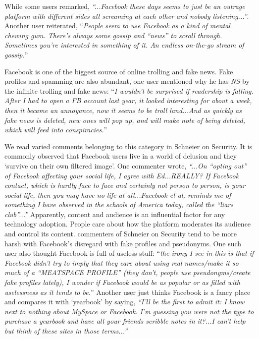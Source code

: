 While some users remarked, \textit{``...Facebook these days seems to just be an outrage platform with different sides all screaming at each other and nobody listening...''}. Another user reiterated, ``\textit{People seem to use Facebook as a kind of mental chewing gum. There's always some gossip and ``news'' to scroll through. Sometimes you're interested in something of it. An endless on-the-go stream of gossip.}''

Facebook is one of the biggest source of online trolling and fake news. Fake profiles and spamming are also abundant, one user mentioned why he has \emph{NS} by the infinite trolling and fake news: ``\textit{I wouldn't be surprised if readership is falling. After I had to open a FB account last year, it looked interesting for about a week, then it became an annoyance, now it seems to be troll land...And as quickly as fake news is deleted, new ones will pop up, and will make note of being deleted, which will feed into conspiracies.}''

We read varied comments belonging to this category in Schneier on Security. It is commonly observed that Facebook users live in a world of delusion and they `survive on their own filtered image'. One commenter wrote, \textit{``...On ``opting out'' of Facebook affecting your social life, I agree with Ed...REALLY? If Facebook contact, which is hardly face to face and certainly not person to person, is your social life, then you may have no life at all...Facebook et al, reminds me of something I have observed in the schools of America today, called the ``liars club''...''} Apparently, content and audience is an influential factor for any technology adoption. People care about how the platform moderates its audience and control its content. commenters of Schneier on Security tend to be more harsh with Facebook's disregard with fake profiles and pseudonyms. One such user also thought Facebook is full of useless stuff:
``\textit{the irony I see in this is that if Facebook didn't try to imply that they care about using real names/make it so much of a ``MEATSPACE PROFILE'' (they don't, people use pseudonyms/create fake profiles lately), I wonder if Facebook would be as popular or as filled with uselessness as it tends to be.}'' Another user just thinks Facebook is a fancy place and compares it with `yearbook' by saying, \textit{``I'll be the first to admit it: I know next to nothing about MySpace or Facebook. I'm guessing you were not the type to purchase a yearbook and have all your friends scribble notes in it?...I can't help but think of these sites in those terms...''}

